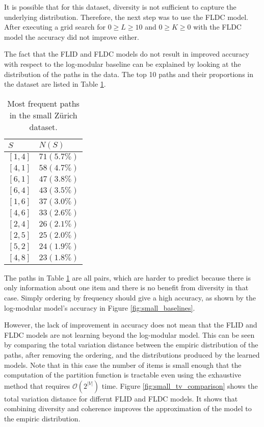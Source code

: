 It is possible that for this dataset, diversity is not sufficient to capture the underlying distribution. Therefore, the next step was to use the FLDC model. After executing a grid search for $0 \geq L \geq 10$ and $0 \geq K \geq 0$ with the FLDC model the accuracy did not improve either.

The fact that the FLID and FLDC models do not result in improved accuracy with respect to the log-modular baseline can be explained by looking at the distribution of the paths in the data. The top 10 paths and their proportions in the dataset are listed in Table \ref{tab:small_top_paths}.

\begin{table}
  \centering
  \caption{Most frequent paths in the small Zürich dataset.}
  \begin{tabular}{@{}ll@{}}
    \toprule
    $S$ & $N(S)$\\
    \midrule
    $[1,4]$ & $71 (5.7\%)$ \\
    $[4,1]$ & $58 (4.7\%)$ \\
    $[6,1]$ & $47 (3.8\%)$ \\
    $[6,4]$ & $43 (3.5\%)$ \\
    $[1,6]$ & $37 (3.0\%)$ \\
    $[4,6]$ & $33 (2.6\%)$ \\
    $[2,4]$ & $26 (2.1\%)$ \\
    $[2,5]$ & $25 (2.0\%)$ \\
    $[5,2]$ & $24 (1.9\%)$ \\
    $[4,8]$ & $23 (1.8\%)$ \\
    \bottomrule
  \end{tabular}
  \label{tab:small_top_paths}
\end{table}

The paths in Table \ref{tab:small_top_paths} are all pairs, which are harder to predict because there is only information about one item and there is no benefit from diversity in that case. Simply ordering by frequency should give a high accuracy, as shown by the log-modular model's accuracy in Figure \ref{fig:small_baselines}.

However, the lack of improvement in accuracy does not mean that the FLID and FLDC models are not learning beyond the log-modular model. This can be seen by comparing the total variation distance between the empiric distribution of the paths, after removing the ordering, and the distributions produced by the learned models. Note that in this case the number of items is small enough that the computation of the partition function is tractable even using the exhaustive method that requires $\mathcal{O}(2^|V|)$ time. Figure \ref{fig:small_tv_comparison} shows the total variation distance for differnt FLID and FLDC models. It shows that combining diversity and coherence improves the approximation of the model to the empiric distribution.

